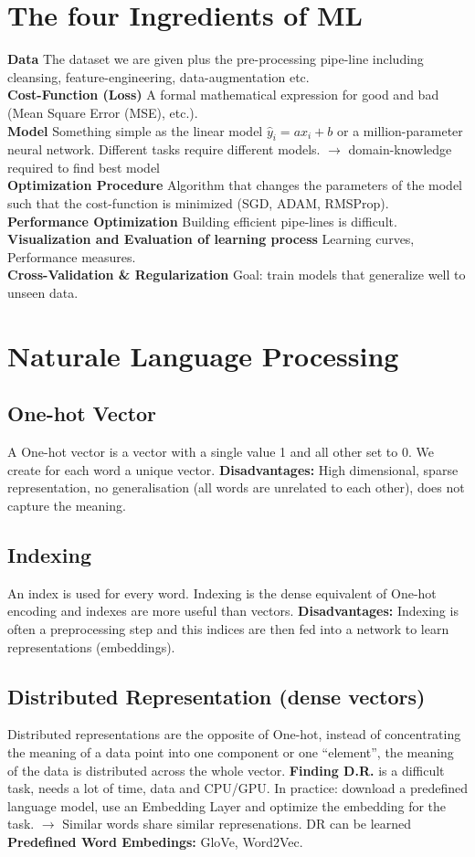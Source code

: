 \section{The four Ingredients of ML}
\textbf{Data} The dataset we are given plus the pre-processing pipe-line including cleansing, feature-engineering, data-augmentation etc. \\
\textbf{Cost-Function (Loss)}
  	A formal mathematical expression for good and bad (Mean Square Error (MSE), etc.). \\
\textbf{Model} Something simple as the linear model $\hat{y}_{i}=ax_{i}+b$ or a million-parameter neural network. Different tasks require different models. $\rightarrow$ domain-knowledge required to find best model \\
\textbf{Optimization Procedure} Algorithm that changes the parameters of the model such that the cost-function is minimized (SGD, ADAM, RMSProp).\\
\textbf{Performance Optimization} Building efficient pipe-lines is difficult. \\
\textbf{Visualization and Evaluation of learning process} Learning curves, Performance measures. \\
\textbf{Cross-Validation \& Regularization} Goal: train models that generalize well to unseen data.

\section{Naturale Language Processing}
\subsection{One-hot Vector}
A One-hot vector is a vector with a single value 1 and all other set to 0. We create for each word a unique vector. \textbf{Disadvantages:} High dimensional, sparse representation, no generalisation (all words are unrelated to each other), does not capture the meaning.

\subsection{Indexing}
An index is used for every word. Indexing is the dense equivalent of One-hot encoding and indexes are more useful than vectors. \textbf{Disadvantages:} Indexing is often a preprocessing step and this indices are then fed into a network to learn representations (embeddings).

\subsection{Distributed Representation (dense vectors)}
Distributed representations are the opposite of One-hot, instead of concentrating the meaning of a data point into one component or one “element”, the meaning of the data is distributed across the whole vector. \textbf{Finding D.R.} is a difficult task, needs a lot of time, data and CPU/GPU. In practice: download a predefined language model, use an Embedding Layer and optimize the embedding for the task. $\rightarrow$ Similar words share similar represenations. DR can be learned \textbf{Predefined Word Embedings:} GloVe, Word2Vec.

